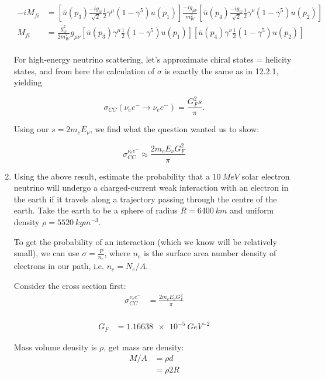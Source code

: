 \begin{enumerate}[label=\textbf{\alph*}.]
  \begin{align*}
    -iM_{fi} &= \left[\bar{u}(p_3)\frac{-ig_w}{\sqrt{2}}\frac{1}{2}\gamma^\mu(1-\gamma^5)u(p_1)\right]\frac{-ig_{\mu\nu}}{m_W^2}\left[\bar{u}(p_4)\frac{-ig_w}{\sqrt{2}}\frac{1}{2}\gamma^\nu(1-\gamma^5)u(p_2)\right] \\
    M_{fi} &= \frac{g_w^2}{2m_W^2}g_{\mu\nu}\left[\bar{u}(p_3)\gamma^\mu\frac{1}{2}(1-\gamma^5)u(p_1)\right]\left[\bar{u}(p_4)\gamma^\nu\frac{1}{2}(1-\gamma^5)u(p_2)\right] \\
  \end{align*}

  For high-energy neutrino scattering, let's approximate chiral states = helicity states, and from here the calculation of $\sigma$ is exactly the same as in 12.2.1, yielding

  $$\sigma_{CC}(\nu_e e^- \to \nu_e e^-) = \frac{G_F^2s}{\pi}.$$

  Using our $s = 2m_e E_\nu$, we find what the question wanted us to show:

  $$\sigma_{CC}^{\nu_e e^-} \approx \frac{2m_e E_\nu G_F^2}{\pi}$$

  \item Using the above result, estimate the probability that a $\SI{10}{MeV}$ solar electron neutrino will undergo a charged-current weak interaction with an electron in the earth if it travels along a trajectory passing through the centre of the earth. Take the earth to be a sphere of radius $R=\SI{6400}{km}$ and uniform density $\rho = \SI{5520}{kgm^{-3}}$.

  To get the probability of an interaction (which we know will be relatively small), we can use $\sigma = \frac{P}{n_e}$, where $n_e$ is the surface area number density of electrons in our path, i.e. $n_e = N_e/A$.

  Consider the cross section first:
  \begin{align*}
    \sigma_{CC}^{\nu_e e^-} &= \frac{2m_e E_\nu G_F^2}{\pi} \\
  \end{align*}
  
  \begin{align*}
    G_F &= \SI{1.16638e-5}{GeV^{-2}}
  \end{align*}

  Mass volume density is $\rho$, get mass are density:
  \begin{align*}
    M/A &= \rho d\\
    &= \rho 2R\\
  \end{align*}


\end{enumerate}

